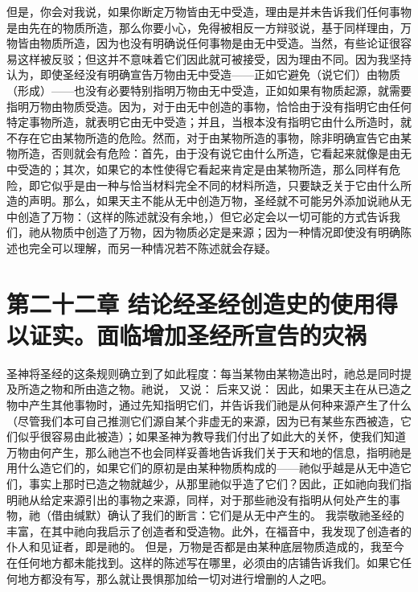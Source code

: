 但是，你会对我说，如果你断定万物皆由无中受造，理由是并未告诉我们任何事物是由先在的物质所造，那么你要小心，免得被相反一方辩驳说，基于同样理由，万物皆由物质所造，因为也没有明确说任何事物是由无中受造。当然，有些论证很容易这样被反驳；但这并不意味着它们因此就可被接受，因为理由不同。因为我坚持认为，即使圣经没有明确宣告万物由无中受造——正如它避免（说它们）由物质（形成）——也没有必要特别指明万物由无中受造，正如如果有物质起源，就需要指明万物由物质受造。因为，对于由无中创造的事物，恰恰由于没有指明它由任何特定事物所造，就表明它由无中受造；并且，当根本没有指明它由什么所造时，就不存在它由某物所造的危险。然而，对于由某物所造的事物，除非明确宣告它由某物所造，否则就会有危险：首先，由于没有说它由什么所造，它看起来就像是由无中受造的；其次，如果它的本性使得它看起来肯定是由某物所造，那么同样有危险，即它似乎是由一种与恰当材料完全不同的材料所造，只要缺乏关于它由什么所造的声明。那么，如果天主不能从无中创造万物，圣经就不可能另外添加说祂从无中创造了万物：（这样的陈述就没有余地，）但它必定会以一切可能的方式告诉我们，祂从物质中创造了万物，因为物质必定是来源；因为一种情况即使没有明确陈述也完全可以理解，而另一种情况若不陈述就会存疑。\par


\section{第二十二章 结论经圣经创造史的使用得以证实。面临增加圣经所宣告的灾祸}

圣神将圣经的这条规则确立到了如此程度：每当某物由某物造出时，祂总是同时提及所造之物和所由造之物。祂说，  又说：  后来又说： 因此，如果天主在从已造之物中产生其他事物时，通过先知指明它们，并告诉我们祂是从何种来源产生了什么（尽管我们本可自己推测它们源自某个非虚无的来源，因为已有某些东西被造，它们似乎很容易由此被造）；如果圣神为教导我们付出了如此大的关怀，使我们知道万物由何产生，那么祂岂不也会同样妥善地告诉我们关于天和地的信息，指明祂是用什么造它们的，如果它们的原初是由某种物质构成的——祂似乎越是从无中造它们，事实上那时已造之物就越少，从那里祂似乎造了它们？因此，正如祂向我们指明祂从给定来源引出的事物之来源，同样，对于那些祂没有指明从何处产生的事物，祂（借由缄默）确认了我们的断言：它们是从无中产生的。  我崇敬祂圣经的丰富，在其中祂向我启示了创造者和受造物。此外，在福音中，我发现了创造者的仆人和见证者，即是祂的。 但是，万物是否都是由某种底层物质造成的，我至今在任何地方都未能找到。这样的陈述写在哪里，必须由的店铺告诉我们。如果它任何地方都没有写，那么就让畏惧那加给一切对进行增删的人之吧。\par

